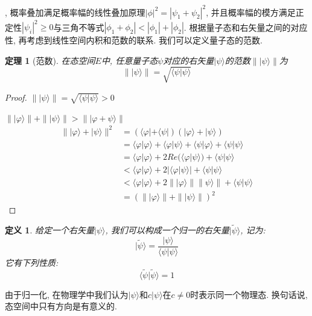 \documentclass[a4paper,11pt]{book}
\newtheorem{definition}{\hspace{2em}定义}[section]
\newtheorem{theorem}{\hspace{2em}定理}[section]
\newtheorem{proof}{证明}[section]
\begin{document}
, 概率叠加满足概率幅的线性叠加原理$|\phi|^2=|\psi_1+\psi_2|^2$, 并且概率幅的模方满足正定性$|\psi_i|^2\geq 0$与三角不等式$|\phi_1+\phi_2|<|\phi_1|+|\phi_2|$. 根据量子态和右矢量之间的对应性, 再考虑到线性空间内积和范数的联系. 我们可以定义量子态的范数.
\begin{theorem}[范数]\label{ket norm}
  在态空间$E$中, 任意量子态$\psi$对应的右矢量$|\psi\rangle$的范数$\||\psi\rangle\|$为
\begin{equation*}
  \||\psi\rangle\|=\sqrt{\langle\psi|\psi\rangle}
\end{equation*}
\end{theorem}
\begin{proof}
  $\||\psi\rangle\|=\sqrt{\langle\psi|\psi\rangle}>0$

$\||\varphi\rangle\|+\||\psi\rangle\|>\||\varphi+\psi\rangle\|$
\begin{equation*}
  \begin{split}
     \||\varphi\rangle+|\psi\rangle\|^2 & =(\langle\varphi|+\langle\psi|)(|\varphi\rangle+|\psi\rangle) \\
       & =\langle\varphi|\varphi\rangle+\langle\varphi|\psi\rangle+\langle\psi|\varphi\rangle+\langle\psi|\psi\rangle \\
       & =\langle\varphi|\varphi\rangle+2Re(\langle\varphi|\psi\rangle)+\langle\psi|\psi\rangle\\
       & <\langle\varphi|\varphi\rangle+2|\langle\varphi|\psi\rangle|+\langle\psi|\psi\rangle\\
       & <\langle\varphi|\varphi\rangle+2\||\varphi\rangle\|\|\psi\rangle\|+\langle\psi|\psi\rangle\\
       & =(\||\varphi\rangle\|+\||\psi\rangle\|)^2
  \end{split}
\end{equation*}
\end{proof}
\begin{definition}\label{ket normalization}
  给定一个右矢量$|\psi\rangle$, 我们可以构成一个归一的右矢量$|\tilde{\psi}\rangle$, 记为:
\begin{equation*}
  |\tilde{\psi}\rangle=\frac{|\psi\rangle}{\langle\psi|\psi\rangle}
\end{equation*}
它有下列性质:
\begin{equation*}\label{normalization con}
  \langle\tilde{\psi}|\tilde{\psi}\rangle=1
\end{equation*}
\end{definition}
由于归一化, 在物理学中我们认为$|\psi\rangle$和$c|\psi\rangle$在$c\neq0$时表示同一个物理态. 换句话说, 态空间中只有方向是有意义的.
\end{document}
